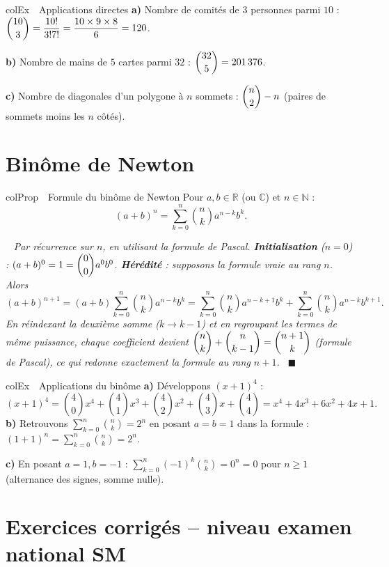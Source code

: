 \documentclass[11pt,a4paper]{article}
\newenvironment{propriete}[1][Propriété]
  {\begin{fiche}{colProp}{\ding{72}~~#1}}{\end{fiche}}
\newenvironment{exemple}[1][Exemple]
  {\begin{fiche}{colEx}{\ding{217}~~#1}}{\end{fiche}}
\newenvironment{demo}
  {\par\smallskip\noindent{\sffamily\bfseries\color{qtealdark}Démonstration.}\ \itshape}
  {\ \normalfont\hfill$\blacksquare$\par\medskip}
\begin{document}
\begin{exemple}[Applications directes]
\textbf{a)} Nombre de comités de $3$ personnes parmi $10$ : $\dbinom{10}3=\dfrac{10!}{3!7!}=\dfrac{10\times9\times8}{6}=120$.

\smallskip
\textbf{b)} Nombre de mains de $5$ cartes parmi $32$ : $\dbinom{32}5=201\,376$.

\smallskip
\textbf{c)} Nombre de diagonales d'un polygone à $n$ sommets : $\dbinom n2-n$ (paires de sommets moins les $n$ côtés).
\end{exemple}

\section{Binôme de Newton}

\begin{propriete}[Formule du binôme de Newton]
Pour $a,b\in\mathbb{R}$ (ou $\mathbb{C}$) et $n\in\mathbb{N}$ :
\[
  (a+b)^n = \sum_{k=0}^n\binom nk a^{n-k}b^k.
\]
\end{propriete}

\begin{demo}
Par récurrence sur $n$, en utilisant la formule de Pascal. \textbf{Initialisation} ($n=0$) : $(a+b)^0=1=\dbinom00a^0b^0$. \textbf{Hérédité} : supposons la formule vraie au rang $n$. Alors
\[
  (a+b)^{n+1} = (a+b)\sum_{k=0}^n\binom nk a^{n-k}b^k = \sum_{k=0}^n\binom nk a^{n-k+1}b^k + \sum_{k=0}^n\binom nk a^{n-k}b^{k+1}.
\]
En réindexant la deuxième somme ($k\to k-1$) et en regroupant les termes de même puissance, chaque coefficient devient $\dbinom nk+\dbinom n{k-1}=\dbinom{n+1}k$ (formule de Pascal), ce qui redonne exactement la formule au rang $n+1$.
\end{demo}

\begin{exemple}[Applications du binôme]
\textbf{a)} Développons $(x+1)^4$ :
\[
  (x+1)^4 = \binom40x^4+\binom41x^3+\binom42x^2+\binom43x+\binom44 = x^4+4x^3+6x^2+4x+1.
\]
\textbf{b)} Retrouvons $\displaystyle\sum_{k=0}^n\binom nk=2^n$ en posant $a=b=1$ dans la formule : $(1+1)^n=\displaystyle\sum_{k=0}^n\binom nk=2^n$.

\smallskip
\textbf{c)} En posant $a=1,b=-1$ : $\displaystyle\sum_{k=0}^n(-1)^k\binom nk=0^n=0$ pour $n\geq1$ (alternance des signes, somme nulle).
\end{exemple}

\section{Exercices corrigés -- niveau examen national SM}
\end{document}

